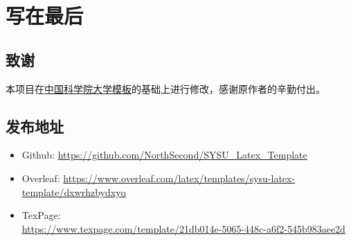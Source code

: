 \documentclass{SYSUReport}
\begin{document}
\section{写在最后}

\subsection{致谢}

本项目在\href{https://github.com/jweihe/UCAS_Latex_Template}{中国科学院大学模板}的基础上进行修改，感谢原作者的辛勤付出。

\subsection{发布地址}

\begin{itemize}
    \item Github: \url{https://github.com/NorthSecond/SYSU_Latex_Template}
    \item Overleaf: \url{https://www.overleaf.com/latex/templates/sysu-latex-template/dxwrhzbydxyq}
    \item TexPage: \\
          \url{https://www.texpage.com/template/21db014e-5065-448c-a6f2-545b983aee2d}
\end{itemize}


\newpage


\end{document}

